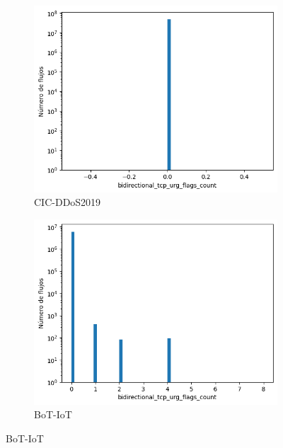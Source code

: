 \begin{figure}[H]
    \centering
    \begin{subfigure}[b]{0.32\textwidth}
        \centering
        \includegraphics[width=\textwidth]{media/packet_pincer_cicddos/bidirectional_tcp_urg_flags_count_linear_x_log_y.png}
        \caption{CIC-DDoS2019}
    \end{subfigure}
    \hfill
    \begin{subfigure}[b]{0.32\textwidth}
        \centering
        \includegraphics[width=\linewidth]{media/packet_pincer_botiot/bidirectional_tcp_urg_flags_count_linear_x_log_y.png}
        \caption{BoT-IoT}
    \end{subfigure}

\end{figure}
